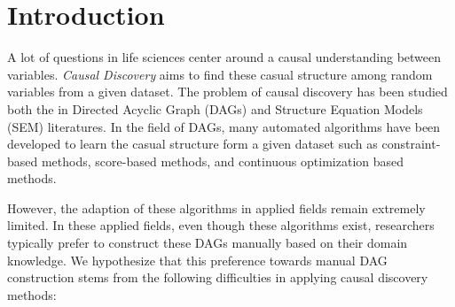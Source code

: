 \documentclass[letterpaper]{article} %
\begin{document}
\section{Introduction}

A lot of questions in life sciences center around a causal understanding
between variables. \emph{Causal Discovery} aims to find these casual structure
among random variables from a given dataset. The problem of causal discovery
has been studied both the in Directed Acyclic Graph (DAGs) and Structure
Equation Models (SEM) literatures. In the field of DAGs, many automated
algorithms have been developed to learn the casual structure form a given 
dataset such as constraint-based methods, score-based methods, and continuous
optimization based methods.


However, the adaption of these algorithms in applied fields remain extremely
limited. In these applied fields, even though these algorithms exist,
researchers typically prefer to construct these DAGs manually based on their
domain knowledge. We hypothesize that this preference towards manual DAG
construction stems from the following difficulties in applying causal discovery
methods:
\end{document}
